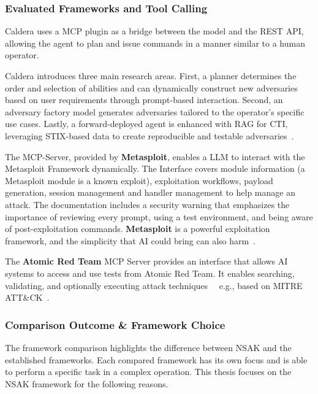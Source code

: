 \subsubsection{Evaluated Frameworks and Tool Calling}

Caldera uses a \gls{MCP} plugin as a bridge between the model and the \gls{REST API},
allowing the agent to plan and issue commands in a manner similar to a human operator.

Caldera introduces three main research areas.
First, a planner determines the order and selection of abilities and can dynamically construct new adversaries based on user requirements through prompt-based interaction.
Second, an adversary factory model generates adversaries tailored to the operator's specific use cases.
Lastly, a forward-deployed agent is enhanced with \gls{RAG} for \gls{CTI}, leveraging \gls{STIX}-based data to create reproducible and testable adversaries~\cite{caldera_mcp_blog}.

The \gls{MCP}-Server, provided by \textbf{Metasploit}, enables a \gls{LLM} to interact with the Metasploit Framework dynamically.
The Interface covers module information (a Metasploit module is a known exploit), exploitation workflows, payload generation,
session management and handler management to help manage an attack.
The documentation includes a security warning that emphasizes the importance of reviewing every prompt,
using a test environment, and being aware of post-exploitation commands.
\textbf{Metasploit} is a powerful exploitation framework, and the simplicity that \gls{AI} could bring can also harm~\cite{metasploit_mcp}.

The \textbf{Atomic Red Team} \gls{MCP} Server provides an interface that allows \gls{AI} systems to access and use tests from Atomic Red Team.
It enables searching, validating, and optionally executing attack techniques
~\textthreequartersemdash~e.g., based on MITRE ATT\&CK~\cite{atomic_red_team_mcp}.

\subsubsection{Comparison Outcome \& Framework Choice}\label{subsubsec:outcome}

The framework comparison highlights the difference between \gls{NSAK} and the established frameworks.
Each compared framework has its own focus and is able to perform a specific task in a complex operation.
This thesis focuses on the \gls{NSAK} framework for the following reasons.
